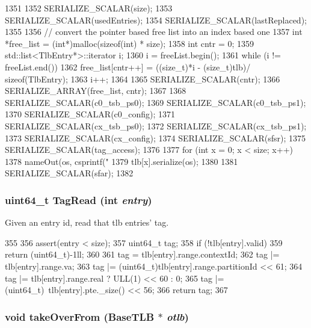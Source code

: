 \begin{DoxyCode}
1351 {
1352     SERIALIZE_SCALAR(size);
1353     SERIALIZE_SCALAR(usedEntries);
1354     SERIALIZE_SCALAR(lastReplaced);
1355 
1356     // convert the pointer based free list into an index based one
1357     int *free_list = (int*)malloc(sizeof(int) * size);
1358     int cntr = 0;
1359     std::list<TlbEntry*>::iterator i;
1360     i = freeList.begin();
1361     while (i != freeList.end()) {
1362         free_list[cntr++] = ((size_t)*i - (size_t)tlb)/ sizeof(TlbEntry);
1363         i++;
1364     }
1365     SERIALIZE_SCALAR(cntr);
1366     SERIALIZE_ARRAY(free_list,  cntr);
1367 
1368     SERIALIZE_SCALAR(c0_tsb_ps0);
1369     SERIALIZE_SCALAR(c0_tsb_ps1);
1370     SERIALIZE_SCALAR(c0_config);
1371     SERIALIZE_SCALAR(cx_tsb_ps0);
1372     SERIALIZE_SCALAR(cx_tsb_ps1);
1373     SERIALIZE_SCALAR(cx_config);
1374     SERIALIZE_SCALAR(sfsr);
1375     SERIALIZE_SCALAR(tag_access);
1376 
1377     for (int x = 0; x < size; x++) {
1378         nameOut(os, csprintf("%
1379         tlb[x].serialize(os);
1380     }
1381     SERIALIZE_SCALAR(sfar);
1382 }
\end{DoxyCode}
\hypertarget{classSparcISA_1_1TLB_aaf85d399be0a94d95fa3282faff835ea}{
\subsubsection[{TagRead}]{\setlength{\rightskip}{0pt plus 5cm}uint64\_\-t TagRead (int {\em entry})}}
\label{classSparcISA_1_1TLB_aaf85d399be0a94d95fa3282faff835ea}
Given an entry id, read that tlb entries' tag. 


\begin{DoxyCode}
355 {
356     assert(entry < size);
357     uint64_t tag;
358     if (!tlb[entry].valid)
359         return (uint64_t)-1ll;
360 
361     tag = tlb[entry].range.contextId;
362     tag |= tlb[entry].range.va;
363     tag |= (uint64_t)tlb[entry].range.partitionId << 61;
364     tag |= tlb[entry].range.real ? ULL(1) << 60 : 0;
365     tag |= (uint64_t)~tlb[entry].pte._size() << 56;
366     return tag;
367 }
\end{DoxyCode}
\hypertarget{classSparcISA_1_1TLB_a15b6c15c1be2ca4de3e65772a02aa29f}{
\subsubsection[{takeOverFrom}]{\setlength{\rightskip}{0pt plus 5cm}void takeOverFrom ({\bf BaseTLB} $\ast$ {\em otlb})}}
\label{classSparcISA_1_1TLB_a15b6c15c1be2ca4de3e65772a02aa29f}



